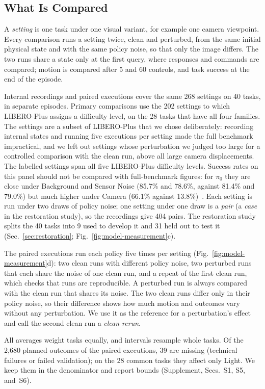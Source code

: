 \subsection{What Is Compared}
\label{sec:comparisons}
A \emph{setting} is one task under one visual variant, for example one camera viewpoint. Every comparison runs a setting twice, clean and perturbed, from the same initial physical state and with the same policy noise, so that only the image differs. The two runs share a state only at the first query, where responses and commands are compared; motion is compared after 5 and 60 controls, and task success at the end of the episode.

Internal recordings and paired executions cover the same 268 settings on 40 tasks, in separate episodes. Primary comparisons use the 202 settings to which LIBERO-Plus assigns a difficulty level, on the 28 tasks that have all four families. The settings are a subset of LIBERO-Plus that we chose deliberately: recording internal states and running five executions per setting made the full benchmark impractical, and we left out settings whose perturbation we judged too large for a controlled comparison with the clean run, above all large camera displacements. The labelled settings span all five LIBERO-Plus difficulty levels. Success rates on this panel should not be compared with full-benchmark figures: for $\pi_0$ they are close under Background and Sensor Noise (85.7\% and 78.6\%, against 81.4\% and 79.0\%) but much higher under Camera (66.1\% against 13.8\%)~\cite{fei2026liberoplus}. Each setting is run under two draws of policy noise; one setting under one draw is a \emph{pair} (a \emph{case} in the restoration study), so the recordings give 404 pairs. The restoration study splits the 40 tasks into 9 used to develop it and 31 held out to test it (Sec.~\ref{sec:restoration}; Fig.~\ref{fig:model-measurement}c).

The paired executions run each policy five times per setting (Fig.~\ref{fig:model-measurement}d): two clean runs with different policy noise, two perturbed runs that each share the noise of one clean run, and a repeat of the first clean run, which checks that runs are reproducible. A perturbed run is always compared with the clean run that shares its noise. The two clean runs differ only in their policy noise, so their difference shows how much motion and outcomes vary without any perturbation. We use it as the reference for a perturbation's effect and call the second clean run a \emph{clean rerun}.



All averages weight tasks equally, and intervals resample whole tasks. Of the 2,680 planned outcomes of the paired executions, 39 are missing (technical failures or failed validation); on the 28 common tasks they affect only Light. We keep them in the denominator and report bounds (Supplement, Secs.~S1, S5, and~S6).
